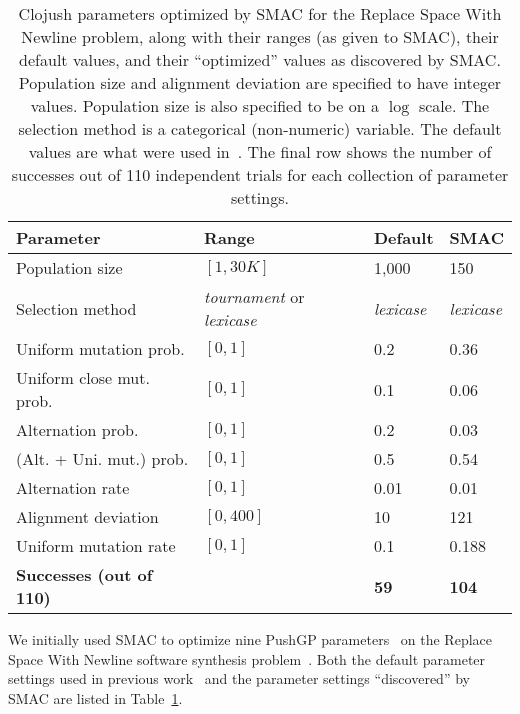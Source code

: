 \begin{table}[t]
	\caption{Clojush parameters optimized by SMAC for the Replace Space With 
	Newline problem, along with their ranges (as given to SMAC), their 
	default values, and their ``optimized'' values as discovered
	by SMAC.  Population size and
	alignment deviation are specified to have integer values.  Population
	size is also specified to be on a $\log$ scale. The selection
	method is a categorical (non-numeric) variable. The default
	values are what were used in~\cite{Helmuth:2015:GECCO}. 
	The final row shows the number of successes out of 110
	independent trials for each collection of parameter settings.
}
	\begin{center}
		\begin{tabular}{p{3.25cm} p{1.5cm} l l}
			\textbf{Parameter} & \textbf{Range} & \textbf{Default} & \textbf{SMAC} \\
			\midrule
			Population size & $[1, 30K]$ & 1,000 & 150 \\
			Selection method & \emph{tournament} \linebreak or \emph{lexicase} & \emph{lexicase} & \emph{lexicase} \\
			\midrule
			Uniform mutation prob. & $[0, 1]$ & 0.2 & 0.36 \\
			Uniform close mut. prob. & $[0, 1]$ & 0.1 & 0.06 \\
			Alternation prob. & $[0, 1]$ & 0.2 & 0.03 \\
			(Alt. + Uni. mut.) prob. & $[0, 1]$ & 0.5 & 0.54 \\
			\midrule
			Alternation rate & $[0, 1]$ & 0.01 & 0.01 \\
			Alignment deviation & $[0, 400]$ & 10 & 121 \\
			\midrule
			Uniform mutation rate & $[0, 1]$ & 0.1 & 0.188 \\
			\midrule
			\noalign{\medskip}
			\textbf{Successes (out of 110)} & & \textbf{59} & \textbf{104} \\
			\bottomrule
		\end{tabular}
	\end{center}
	\label{tab:RswnResults}
\end{table}

We initially used SMAC to optimize nine
PushGP parameters~\cite{Helmuth:2015:dissertation}
on the Replace Space With Newline
software synthesis problem~\cite{Helmuth:2015:GECCO}. Both the default
parameter settings used in previous work~\cite{Helmuth:2015:GECCO} and the 
parameter settings ``discovered'' by SMAC are listed in 
Table~\ref{tab:RswnResults}.

